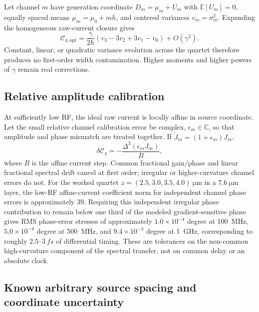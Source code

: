\documentclass[11pt]{article}
\newcommand{\Cfour}{\mathcal{C}_4}
\newcommand{\E}{\mathbb{E}}
\begin{document}
Let channel $m$ have generation coordinate $D_m=\mu_m+U_m$ with $\E[U_m]=0$, equally spaced means $\mu_m=\mu_0+mh$, and centered variances $v_m=\sigma_m^2$. Expanding the homogeneous raw-current closure gives
\begin{equation}
\boxed{
\mathcal{C}_{4,\mathrm{opt}}
=\frac{\gamma}{2h}(v_3-3v_2+3v_1-v_0)+O(\gamma^2).}
\label{eq:opticalerror}
\end{equation}
Constant, linear, or quadratic variance evolution across the quartet therefore produces no first-order width contamination. Higher moments and higher powers of $\gamma$ remain real corrections.

\subsection{Relative amplitude calibration}

At sufficiently low RF, the ideal raw current is locally affine in source coordinate. Let the small relative channel calibration error be complex, $\epsilon_m\in\mathbb C$, so that amplitude and phase mismatch are treated together. If $\widetilde J_m=(1+\epsilon_m)J_m$,
\begin{equation}
\boxed{
\delta\Cfour=-\frac{\Delta^3(\epsilon_mJ_m)}{B},}
\label{eq:ampcal}
\end{equation}
where $B$ is the affine current step. Common fractional gain/phase and linear fractional spectral drift cancel at first order; irregular or higher-curvature channel errors do not. For the worked quartet $z=(2.5,3.0,3.5,4.0)~\si{\micro\meter}$ in a $7.6~\si{\micro\meter}$ layer, the low-RF affine-current coefficient norm for independent channel phase errors is approximately $39$. Requiring this independent irregular phase contribution to remain below one third of the modeled gradient-sensitive phase gives RMS phase-error stresses of approximately $1.0\times10^{-4}$ degree at \SI{100}{MHz}, $5.0\times10^{-4}$ degree at \SI{500}{MHz}, and $9.4\times10^{-4}$ degree at \SI{1}{GHz}, corresponding to roughly $2.5$--$3~\si{fs}$ of differential timing. These are tolerances on the non-common high-curvature component of the spectral transfer, not on common delay or an absolute clock.

\subsection{Known arbitrary source spacing and coordinate uncertainty}
\end{document}
